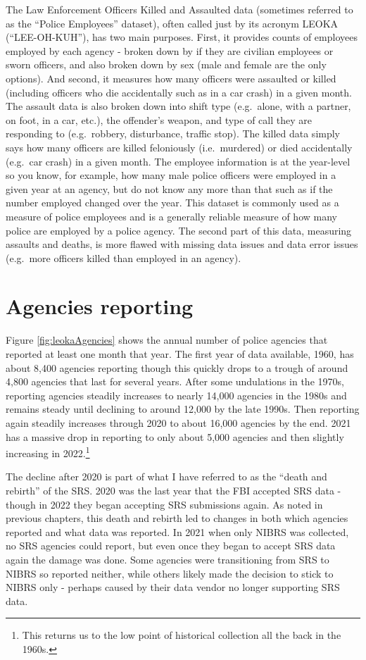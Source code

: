 \documentclass[
]{krantz}
\begin{document}
The Law Enforcement Officers Killed and Assaulted data
(sometimes referred to as the ``Police Employees'' dataset),
often called just by its acronym LEOKA (``LEE-OH-KUH''), has
two main purposes. First, it provides counts of employees
employed by each agency - broken down by if they are
civilian employees or sworn officers, and also broken down
by sex (male and female are the only options). And second,
it measures how many officers were assaulted or killed
(including officers who die accidentally such as in a car
crash) in a given month. The assault data is also broken
down into shift type (e.g.~alone, with a partner, on foot,
in a car, etc.), the offender's weapon, and type of call
they are responding to (e.g.~robbery, disturbance, traffic
stop). The killed data simply says how many officers are
killed feloniously (i.e.~murdered) or died accidentally
(e.g.~car crash) in a given month. The employee information
is at the year-level so you know, for example, how many male
police officers were employed in a given year at an agency,
but do not know any more than that such as if the number
employed changed over the year. This dataset is commonly
used as a measure of police employees and is a generally
reliable measure of how many police are employed by a police
agency. The second part of this data, measuring assaults and
deaths, is more flawed with missing data issues and data
error issues (e.g.~more officers killed than employed in an
agency).

\section{Agencies reporting}\label{agencies-reporting-3}

Figure \ref{fig:leokaAgencies} shows the annual number of
police agencies that reported at least one month that year.
The first year of data available, 1960, has about 8,400
agencies reporting though this quickly drops to a trough of
around 4,800 agencies that last for several years. After
some undulations in the 1970s, reporting agencies steadily
increases to nearly 14,000 agencies in the 1980s and remains
steady until declining to around 12,000 by the late 1990s.
Then reporting again steadily increases through 2020 to
about 16,000 agencies by the end. 2021 has a massive drop in
reporting to only about 5,000 agencies and then slightly
increasing in 2022.\footnote{This returns us to the low
  point of historical collection all the back in the 1960s.}

The decline after 2020 is part of what I have referred to as
the ``death and rebirth'' of the SRS. 2020 was the last year
that the FBI accepted SRS data - though in 2022 they began
accepting SRS submissions again. As noted in previous
chapters, this death and rebirth led to changes in both
which agencies reported and what data was reported. In 2021
when only NIBRS was collected, no SRS agencies could report,
but even once they began to accept SRS data again the damage
was done. Some agencies were transitioning from SRS to NIBRS
so reported neither, while others likely made the decision
to stick to NIBRS only - perhaps caused by their data vendor
no longer supporting SRS data.
\end{document}
